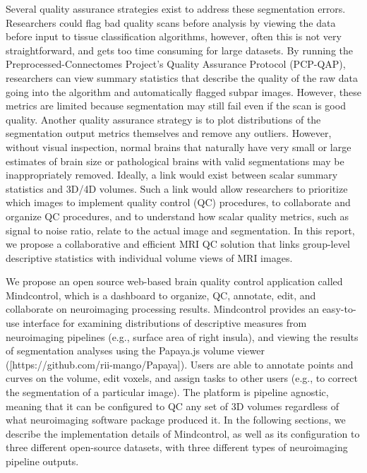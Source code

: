Several quality assurance strategies exist to address these segmentation errors. Researchers could flag bad quality scans before analysis by viewing the data before input to tissue classification algorithms, however, often this is not very straightforward, and gets too time consuming for large datasets. By running the Preprocessed-Connectomes Project’s Quality Assurance Protocol (PCP-QAP)\cite{shehzadpreprocessed}, researchers can view summary statistics that describe the quality of the raw data going into the algorithm and automatically flagged subpar images. However, these metrics are limited because segmentation may still fail even if the scan is good quality. Another quality assurance strategy is to plot distributions of the segmentation output metrics themselves and remove any outliers. However, without visual inspection, normal brains that naturally have very small or large estimates of brain size or pathological brains with valid segmentations may be inappropriately removed. Ideally, a link would exist between scalar summary statistics and 3D/4D volumes. Such a link would allow researchers to prioritize which images to implement quality control (QC) procedures, to collaborate and organize QC procedures, and to understand how scalar quality metrics, such as signal to noise ratio, relate to the actual image and segmentation. In this report, we propose a collaborative and efficient MRI QC solution that links group-level descriptive statistics with individual volume views of MRI images.  

We propose an open source web-based brain quality control application called Mindcontrol, which is a dashboard to organize, QC, annotate, edit, and collaborate on neuroimaging processing results. Mindcontrol provides an easy-to-use interface for examining distributions of descriptive measures from neuroimaging pipelines (e.g., surface area of right insula), and viewing the results of segmentation analyses using the Papaya.js volume viewer (\href{https://github.com/rii-mango/Papaya}[https://github.com/rii-mango/Papaya]). Users are able to annotate points and curves on the volume, edit voxels, and assign tasks to other users (e.g., to correct the segmentation of a particular image). The platform is pipeline agnostic, meaning that it can be configured to QC any set of 3D volumes regardless of what neuroimaging software package produced it. In the following sections, we describe the implementation details of Mindcontrol, as well as its configuration to three different open-source datasets, with three different types of neuroimaging pipeline outputs. 

